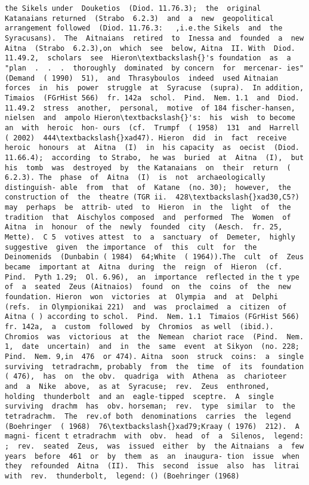 \documentclass[11pt]{article}
\begin{document}
\begin{Verbatim}[commandchars=\\\{\}]
the Sikels under  Douketios  (Diod. 11.76.3);  the  original  Katanaians returned  (Strabo  6.2.3)  and  a  new  geopolitical  arrangement followed  (Diod. 11.76.3:   ,i.e.the Sikels  and  the  Syracusans).  The  Aitnaians  retired  to  Inessa and  founded  a  new  Aitna  (Strabo  6.2.3),on  which  see  below, Aitna  II. With  Diod. 11.49.2,  scholars  see  Hieron\textbackslash{}'s foundation  as  a "plan  .  .  .  thoroughly  dominated  by concern  for  mercenar- ies"  (Demand  ( 1990)  51),  and  Thrasyboulos  indeed  used Aitnaian  forces  in  his  power  struggle  at  Syracuse  (supra).  In addition,  Timaios  (FGrHist 566)  fr. 142a  schol.  Pind.  Nem. 1.1  and  Diod. 11.49.2  stress  another,  personal,  motive  of 184 fischer-hansen,  nielsen  and  ampolo Hieron\textbackslash{}'s:  his  wish  to become  an  with  heroic  hon- ours  (cf.  Trumpf  ( 1958)  131  and  Harrell  ( 2002)  444\textbackslash{}xad47). Hieron  did  in  fact  receive  heroic  honours  at  Aitna  (I)  in  his capacity  as  oecist  (Diod. 11.66.4);  according  to Strabo,  he was  buried  at  Aitna  (I),  but  his  tomb  was  destroyed  by  the Katanaians  on  their  return  ( 6.2.3). The  phase  of  Aitna  (I)  is  not  archaeologically  distinguish- able  from  that  of  Katane  (no. 30);  however,  the  construction of  the  theatre (TGR ii.  428\textbackslash{}xad30,C5?)  may  perhaps  be  attrib- uted  to  Hieron  in  the  light  of  the  tradition  that  Aischylos composed  and  performed  The  Women  of  Aitna  in  honour  of the  newly  founded  city  (Aesch.  fr. 25,  Mette).  C 5  votives attest  to  a  sanctuary  of  Demeter,  highly  suggestive  given  the importance  of  this  cult  for  the  Deinomenids  (Dunbabin ( 1984)  64;White  ( 1964)).The  cult  of  Zeus  became  important at  Aitna  during  the  reign  of  Hieron  (cf.  Pind.  Pyth 1.29;  Ol. 6.96),  an  importance  reflected in the t ype  of  a  seated  Zeus (Aitnaios)  found  on  the  coins  of  the  new  foundation. Hieron  won  victories  at  Olympia  and  at  Delphi  (refs.  in Olympionikai 221)  and  was  proclaimed  a  citizen  of  Aitna ( ) according to schol.  Pind.  Nem. 1.1  Timaios (FGrHist 566)  fr. 142a,  a  custom  followed  by  Chromios  as well  (ibid.).  Chromios  was  victorious  at  the  Nemean  chariot race  (Pind.  Nem. 1,  date  uncertain)  and  in  the  same  event  at Sikyon  (no. 228;  Pind.  Nem. 9,in  476  or 474). Aitna  soon  struck  coins:  a  single  surviving  tetradrachm, probably  from  the  time  of  its  foundation  ( 476),  has  on  the obv.  quadriga  with  Athena  as  charioteer  and  a  Nike  above,  as at  Syracuse;  rev.  Zeus  enthroned,  holding  thunderbolt  and an  eagle-tipped  sceptre.  A  single  surviving  drachm  has  obv. horseman;  rev.  type  similar  to  the  tetradrachm.  The  rev.of both  denominations  carries  the  legend   (Boehringer  ( 1968)  76\textbackslash{}xad79;Kraay ( 1976)  212).  A  magni- ficent t etradrachm  with  obv.  head  of  a  Silenos,  legend: ;  rev.  seated  Zeus,  was  issued  either  by  the Aitnaians  a  few  years  before  461  or  by  them  as  an  inaugura- tion  issue  when  they  refounded  Aitna  (II).  This  second  issue  also  has  litrai  with  rev.  thunderbolt,  legend: () (Boehringer (1968)  
\end{Verbatim}
\end{document}
